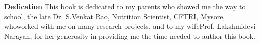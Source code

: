 \thispagestyle{empty}


\vspace*{\fill}
\begingroup
\centering
{\Huge\textbf{Dedication}}
\vskip 10pt
This book is dedicated to my parents who showed me the 
 way to school, the late Dr. S.Venkat Rao, Nutrition Scientist, CFTRI, Mysore, who\break worked with me on many research projects, and to my wife\break Prof. Lakshmidevi Narayan, for her generosity in providing me the time needed to author this book.
 \endgroup
\vspace*{\fill}
